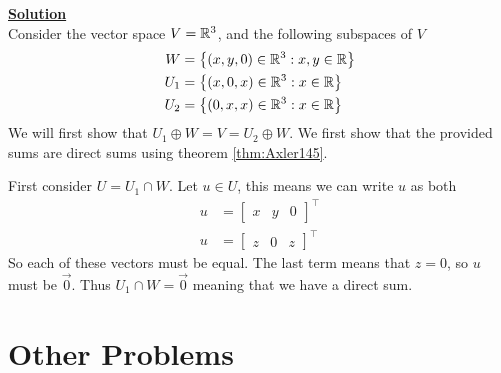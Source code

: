 \documentclass[answers]{exam}
\begin{document}
\begin{questions}
\begin{solution}
        \underline{\textbf{Solution}}\\
        Consider the vector space $V=\mathbb{R}^3$, and the following subspaces of $V$
        \begin{align*}
            W &= \left\{(x,y,0)\in\mathbb{R}^3 : x,y\in\mathbb{R}\right\}\\
            U_1 &= \left\{(x,0,x)\in\mathbb{R}^3 : x\in\mathbb{R}\right\}\\
            U_2 &= \left\{(0,x,x)\in\mathbb{R}^3 : x\in\mathbb{R}\right\}
        \end{align*}
        We will first show that $U_1\oplus W = V = U_2\oplus W$. We first show that the provided sums
        are direct sums using theorem \ref{thm:Axler145}.

        First consider $U=U_1\cap W$. Let $u\in U$, this means we can write $u$ as both
        \begin{align*}
            u &= \begin{bmatrix} x&y&0\end{bmatrix}^\top \\
            u &= \begin{bmatrix} z&0&z\end{bmatrix}^\top
        \end{align*}
        So each of these vectors must be equal. The last term means that $z = 0$, so $u$ must be $\vec{0}$.
        Thus $U_1\cap W = \vec{0}$ meaning that we have a direct sum.
    \end{solution}
\end{questions}

\section{Other Problems}
\end{document}
